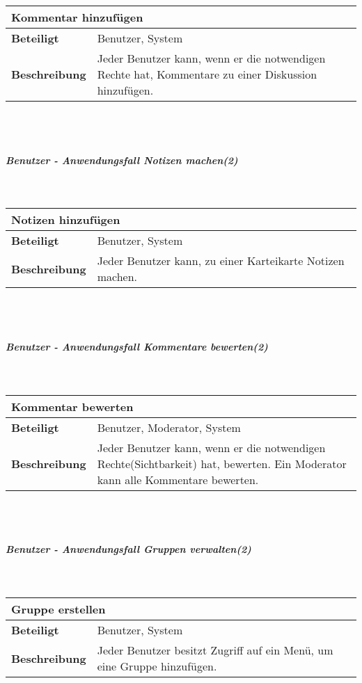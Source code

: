 \documentclass[12pt,a4paper]{article}
\begin{document}
\begin{tabular}{l p{10cm}}
\multicolumn{2}{l}{\textbf{Kommentar hinzufügen}} \\ \hline
\textbf{Beteiligt} & Benutzer, System \\ \hline 
\textbf{Beschreibung} & Jeder Benutzer kann, wenn er die notwendigen Rechte hat, Kommentare zu einer Diskussion hinzufügen.\\ 
\hline 
\end{tabular}\\\\
\subparagraph{Benutzer - Anwendungsfall \glqq Notizen machen\grqq (2)}\mbox{}\\

\begin{tabular}{l p{10cm}}
\multicolumn{2}{l}{\textbf{Notizen hinzufügen}} \\ \hline
\textbf{Beteiligt} & Benutzer, System \\ \hline 
\textbf{Beschreibung} & Jeder Benutzer kann, zu einer Karteikarte Notizen machen.\\ 
\hline 
\end{tabular}\\\\
\subparagraph{Benutzer - Anwendungsfall \glqq Kommentare bewerten\grqq (2)}\mbox{}\\

\begin{tabular}{l p{10cm}}
\multicolumn{2}{l}{\textbf{Kommentar bewerten}} \\ \hline
\textbf{Beteiligt} & Benutzer, Moderator, System \\ \hline 
\textbf{Beschreibung} & Jeder Benutzer kann, wenn er die notwendigen Rechte(Sichtbarkeit) hat, bewerten. Ein Moderator kann alle Kommentare bewerten.\\ 
\hline 
\end{tabular}\\\\
\subparagraph{Benutzer - Anwendungsfall \glqq Gruppen verwalten\grqq (2)}\mbox{}\\

\begin{tabular}{l p{10cm}}
\multicolumn{2}{l}{\textbf{Gruppe erstellen}} \\ \hline
\textbf{Beteiligt} & Benutzer, System \\ \hline 
\textbf{Beschreibung} & Jeder Benutzer besitzt Zugriff auf ein Menü, um eine Gruppe hinzufügen.\\ 
\hline 
\end{tabular}\\\\
\end{document}
